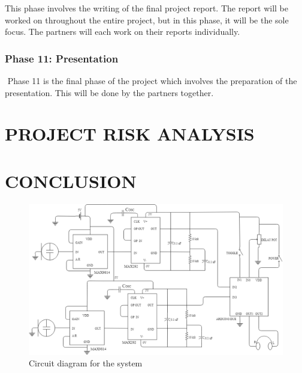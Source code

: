 \documentclass[10pt,twocolumn]{witseiepaper}
\begin{document}
This phase involves the writing of the final project report. The report will be worked on throughout the entire project, but in this phase, it will be the sole focus. The partners will each work on their reports individually.

\subsubsection*{Phase 11: Presentation} $    $
Phase 11 is the final phase of the project which involves the preparation of the presentation. This will be done by the partners together.


\section{PROJECT RISK ANALYSIS}

\section{CONCLUSION}






\newpage
\onecolumn
{}
\setcounter{page}{1}
\setcounter{figure}{0} 
\renewcommand{\thefigure}
{A\arabic{figure}}

\begin{appendix}
	\begin{figure}[h]
		\centering
		\includegraphics[width=1\textwidth]{fullCircuitDiagram.png}
		\caption{Circuit diagram for the system}
		\raggedright
		\label{fig:circuit}	
	\end{figure}
\end{appendix}
\end{document}
